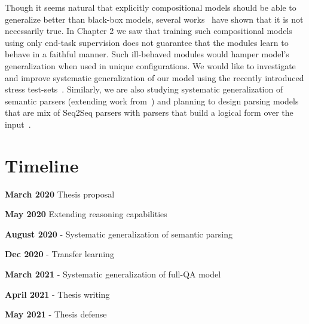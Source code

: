 \documentclass[main.tex]{subfiles}
\begin{document}
Though it seems natural that explicitly compositional models should be able to generalize better than black-box models, several works~\cite{sys-generalization-2018,closure-generalization-2020} have shown that it is not necessarily true.  In Chapter 2 we saw that training such compositional models using only end-task supervision does not guarantee that the modules learn to behave in a faithful manner.  Such ill-behaved modules would hamper model's generalization when used in unique configurations.
 We would like to investigate and improve systematic generalization of our model using the recently introduced stress test-sets~\cite{contrast-sets-2020}. Similarly, we are also studying systematic generalization of semantic parsers (extending work from~) and planning to design parsing models that are mix of Seq2Seq parsers with  parsers that build a logical form over the input~\cite{zettlemoyer-pccg-2005,pasupat-liang-2015,gupta-ncds-2018}.


\section{Timeline}

\noindent
\textbf{March 2020} Thesis proposal

\noindent
\textbf{May 2020} Extending reasoning capabilities

\noindent
\textbf{August 2020} - Systematic generalization of semantic parsing

\noindent
\textbf{Dec 2020} - Transfer learning

\noindent
\textbf{March 2021} - Systematic generalization of full-QA model

\noindent
\textbf{April 2021} - Thesis writing

\noindent
\textbf{May 2021} - Thesis defense











\end{document}
